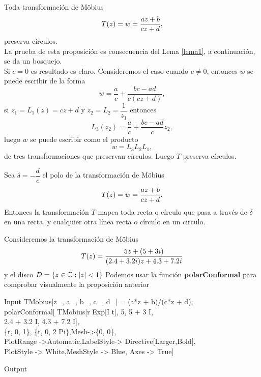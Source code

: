 \begin{prop}
	Toda transformación de M\"obius 
	\begin{equation}\label{trmob}
		T(z)=w=\dfrac{az+b}{cz+d},
	\end{equation}
	preserva círculos.\\
	La prueba de esta proposición es consecuencia del Lema \ref{lema1}, a continuación, se da un bosquejo.\\
	Si $c=0$ es resultado es claro. Consideremos el caso cuando $c\neq0$, entonces $w$ se puede escribir de la forma 
	$$w=\dfrac{a}{c}+\dfrac{bc-ad}{c(cz+d)},$$
	si $z_1=L_1(z)=cz+d$ y $z_2=L_2=\dfrac{1}{z_1}$ entonces 
	$$L_3(z_2)=\dfrac{a}{c}+\dfrac{bc-ad}{c}z_2,$$
	luego $w$ se puede escribir como el producto $$w=L_3L_2L_1,$$ de tres transformaciones que preservan círculos. Luego $T$ preserva círculos.
\end{prop}
\begin{coro}
	Sea $\delta=-\dfrac{d}{c}$ el polo de la transformación de M\"obius $$T(z)=w=\dfrac{az+b}{cz+d}.$$ Entonces la transformación $T$ mapea toda recta o círculo que pasa a través de $\delta$ en una recta,  y cualquier otra línea recta o círculo en un circulo.
\end{coro}
Consideremos la transformación de M\"obius $$T(z)=\dfrac{5z+(5+3i)}{(2.4+3.2i)z+{4.3+7.2i}}$$
y el disco $D=\{z\in \mathbb{C}: |z|< 1\}$
Podemos usar la función \textbf{polarConformal} para comprobar visualmente la proposición anterior
\begin{mmaCell}{Input}
	 TMobius[z_, a_, b_, c_, d_] = (a*z + b)/(c*z + d);\\polarConformal[ TMobius[r Exp[I t], 5, 5 + 3 I,\\2.4 + 3.2 I, 4.3 + 7.2 I],\\\{r, 0, 1\}, \{t, 0, 2 Pi\},Mesh->\{0, 0\},\\PlotRange ->Automatic,LabelStyle-> Directive[Larger,Bold],\\PlotStyle -> White,MeshStyle -> Blue, Axes -> True]
\end{mmaCell}
\begin{mmaCell}[moregraphics={moreig={scale=0.7}}]{Output}
\end{mmaCell}


